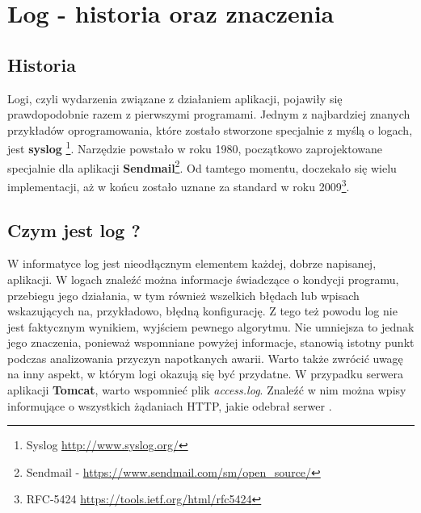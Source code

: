 \section{Log - historia oraz znaczenia}
\label{chapter:logs:history}

    \subsection{Historia}
    Logi, czyli wydarzenia związane z działaniem aplikacji, pojawiły się prawdopodobnie razem z pierwszymi programami.
    Jednym z najbardziej znanych przykładów oprogramowania, które zostało stworzone specjalnie z myślą o logach, jest \textbf{syslog}
    \footnote{Syslog \url{http://www.syslog.org/}}. Narzędzie powstało w roku 1980, początkowo zaprojektowane specjalnie
    dla aplikacji \textbf{Sendmail}\footnote{Sendmail - \url{https://www.sendmail.com/sm/open_source/}}. Od tamtego momentu,
    doczekało się wielu implementacji, aż w końcu zostało uznane za standard w roku 2009\footnote{RFC-5424 \url{https://tools.ietf.org/html/rfc5424}}.

    \subsection{Czym jest log ?}
    \label{chapter:logs:history:what_is_log}
    W informatyce log jest nieodłącznym elementem każdej, dobrze napisanej, aplikacji. 
    W logach znaleźć można informacje świadczące o kondycji programu, przebiegu jego działania, w tym również
    wszelkich błędach lub wpisach wskazujących na, przykładowo, błędną konfigurację. Z tego też powodu log nie jest faktycznym wynikiem,
    wyjściem pewnego algorytmu. Nie umniejsza to jednak jego znaczenia, ponieważ wspomniane powyżej informacje, stanowią
    istotny punkt podczas analizowania przyczyn napotkanych awarii. Warto także zwrócić uwagę na inny aspekt,
    w którym logi okazują się być przydatne. W przypadku serwera aplikacji \textbf{Tomcat}, warto wspomnieć
    plik \textit{access.log}. Znaleźć w nim można wpisy informujące o wszystkich żądaniach HTTP, jakie odebrał
    serwer \cite{tomcat_logs}.
    
